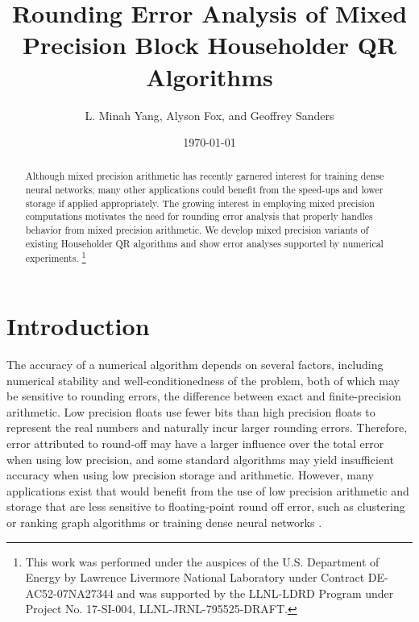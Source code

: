 \documentclass[review,onefignum,onetabnum]{siamart190516}
\title{Rounding Error Analysis of Mixed Precision Block Householder QR Algorithms}
\author{L. Minah Yang, Alyson Fox, and Geoffrey Sanders}
\date{\today}
\newcommand\blfootnote[1]{%
	\begingroup
	\renewcommand\thefootnote{}\footnote{#1}%
	\addtocounter{footnote}{-1}%
	\endgroup
}
\begin{document}
\maketitle
\begin{abstract}
	Although mixed precision arithmetic has recently garnered interest for training dense neural networks, many other applications could benefit from the  speed-ups and lower storage if applied appropriately. 
	The growing interest in employing mixed precision computations motivates the need for rounding error analysis that properly handles behavior from mixed precision arithmetic.
	We develop mixed precision variants of existing Householder QR algorithms and show error analyses supported by numerical experiments.
	\blfootnote{This work was performed under the auspices of the U.S. Department of Energy by Lawrence Livermore National Laboratory under Contract DE-AC52-07NA27344 and was supported by the LLNL-LDRD Program under Project No. 17-SI-004, LLNL-JRNL-795525-DRAFT.}
\end{abstract}
\section{Introduction}\label{sec:intro}
%

The accuracy of a numerical algorithm depends on several factors, including numerical stability and well-conditionedness of the problem, both of which may be sensitive to rounding errors, the difference between exact and finite-precision arithmetic. 
Low precision floats use fewer bits than high precision floats to represent the real numbers and naturally incur larger rounding errors. 
Therefore, error attributed to round-off may have a larger influence over the total error when using low precision, and some standard algorithms may yield insufficient accuracy when using low precision storage and arithmetic.
However, many applications exist that would benefit from the use of low precision arithmetic and storage that are less sensitive to floating-point round off error, such as clustering or ranking graph algorithms \cite{vonLuxburg2007} or training dense neural networks \cite{micikevicius2018mixed}.\par
\end{document}
